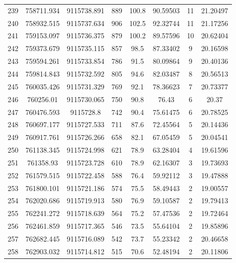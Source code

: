 \begin{longtable}{cccccccc}
239  & 758711.934      & 9115738.891      & 889     & 100.8 & 90.59503 & 11 & 21.20497 \\
240  & 758932.515      & 9115737.634      & 906     & 102.5 & 92.32744 & 11 & 21.17256 \\
241  & 759153.097      & 9115736.375      & 879     & 100.2 & 89.57596 & 10 & 20.62404 \\
242  & 759373.679      & 9115735.115      & 857     & 98.5  & 87.33402 & 9  & 20.16598 \\
243  & 759594.261      & 9115733.854      & 786     & 91.5  & 80.09864 & 9  & 20.40136 \\
244  & 759814.843      & 9115732.592      & 805     & 94.6  & 82.03487 & 8  & 20.56513 \\
245  & 760035.426      & 9115731.329      & 769     & 92.1  & 78.36623 & 7  & 20.73377 \\
246  & 760256.01       & 9115730.065      & 750     & 90.8  & 76.43    & 6  & 20.37    \\
247  & 760476.593      & 9115728.8        & 742     & 90.4  & 75.61475 & 6  & 20.78525 \\
248  & 760697.177      & 9115727.533      & 711     & 87.6  & 72.45564 & 5  & 20.14436 \\
249  & 760917.761      & 9115726.266      & 658     & 82.1  & 67.05459 & 5  & 20.04541 \\
250  & 761138.345      & 9115724.998      & 621     & 78.9  & 63.28404 & 4  & 19.61596 \\
251  & 761358.93       & 9115723.728      & 610     & 78.9  & 62.16307 & 3  & 19.73693 \\
252  & 761579.515      & 9115722.458      & 588     & 76.4  & 59.92112 & 3  & 19.47888 \\
253  & 761800.101      & 9115721.186      & 574     & 75.5  & 58.49443 & 2  & 19.00557 \\
254  & 762020.686      & 9115719.913      & 580     & 76.9  & 59.10587 & 2  & 19.79413 \\
255  & 762241.272      & 9115718.639      & 564     & 75.2  & 57.47536 & 2  & 19.72464 \\
256  & 762461.859      & 9115717.365      & 546     & 73.5  & 55.64104 & 2  & 19.85896 \\
257  & 762682.445      & 9115716.089      & 542     & 73.7  & 55.23342 & 2  & 20.46658 \\
258  & 762903.032      & 9115714.812      & 515     & 70.6  & 52.48194 & 2  & 20.11806 \\

\end{longtable}
